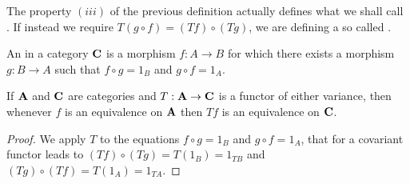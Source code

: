 \documentclass[../1.tex]{subfiles}
\begin{document}
    The property $(iii)$ of the previous definition actually defines what we shall call .
    If instead we require $T(g \circ f) = (Tf) \circ (Tg)$, we are defining a so called .

    \begin{defn}
        An  in a category $\textbf{C}$ is a morphism $f : A \to B$ for which there exists a morphism $g : B \to A$ such that
        $ f \circ g = 1_B$ and $ g \circ f = 1_A$.
    \end{defn}

    \begin{thm}
        If $\textbf{A}$ and $\textbf{C}$ are categories and $T : \textbf{A} \to \textbf{C}$ is a functor of either variance, then whenever $f$ is 
        an equivalence on $\textbf{A}$ then $Tf$ is an equivalence on $\textbf{C}$.
    \end{thm}
    \begin{proof}
        We apply $T$ to the equations $ f \circ g = 1_B$ and $ g \circ f = 1_A$, that for a covariant functor leads to 
        $(Tf) \circ (Tg) = T(1_B) = 1_{TB}$ and $(Tg) \circ (Tf) = T(1_A) = 1_{TA}$.
    \end{proof}
\end{document}
